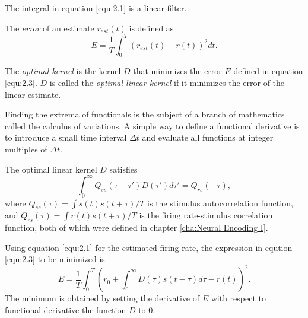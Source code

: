 \begin{rem}
  The integral in equation \ref{equ:2.1} is a linear filter.
\end{rem}

\begin{defn}
  The \emph{error} of an estimate $r_{est}(t)$ is defined as
  \begin{equation}
    \label{equ:2.3}
    E = \frac{1}{T}\int_0^T(r_{est}(t)-r(t))^2dt.
  \end{equation}
\end{defn}

\begin{defn}
  The \emph{optimal kernel} is the kernel $D$ that minimizes the error $E$ defined in equation \ref{equ:2.3}. $D$ is called the \emph{optimal linear kernel} if it minimizes the error of the linear estimate.
\end{defn}

\begin{rem}
  Finding the extrema of functionals is the subject of a branch of mathematics called the calculus of variations. A simple way to define a functional derivative is to introduce a small time interval $\Delta t$ and
evaluate all functions at integer multiples of $\Delta t$.
\end{rem}

\begin{prop}
  The optimal linear kernel $D$ satisfies
  \begin{equation}
    \label{equ:2.4}
    \int_0^{\infty}Q_{ss}(\tau-\tau')D(\tau')d\tau' = Q_{rs}(-\tau),
  \end{equation}
  where $Q_{ss}(\tau) = \int s(t)s(t+\tau)/T$ is the stimulus autocorrelation function, and $Q_{rs}(\tau) = \int r(t)s(t+\tau)/T$ is the firing rate-stimulus correlation function, both of which were defined in chapter \ref{cha:Neural Encoding I}.
\end{prop}
\begin{solution}
  Using equation \ref{equ:2.1} for the estimated firing rate, the expression in eqution \ref{equ:2.3} to be minimized is
  \begin{equation}
    \label{equ:2.48}
    E = \frac{1}{T}\int_0^T\left(r_0 + \int_0^{\infty}D(\tau) s(t-\tau)d\tau - r(t)\right)^2.
  \end{equation}
  The minimum is obtained by setting the derivative of $E$ with respect to functional derivative the function $D$ to $0$.
\end{solution}





